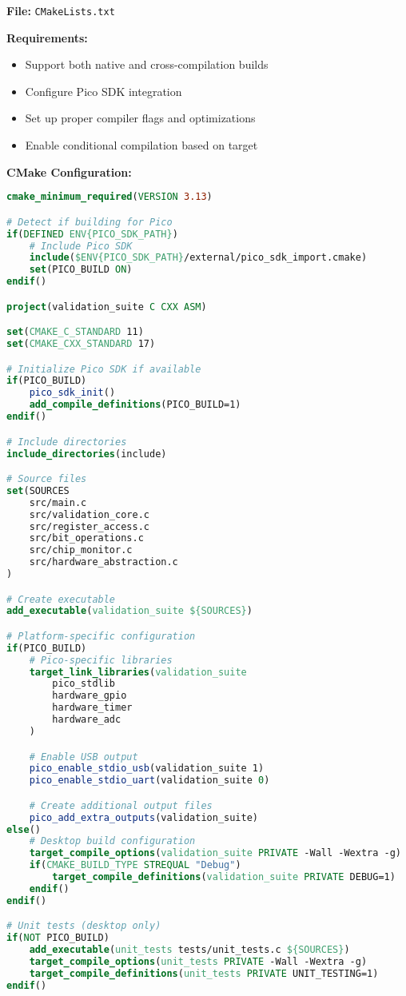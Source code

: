 \documentclass[11pt,a4paper]{article}
\begin{document}
\textbf{File:} \texttt{CMakeLists.txt}

\textbf{Requirements:}
\begin{itemize}
    \item Support both native and cross-compilation builds
    \item Configure Pico SDK integration
    \item Set up proper compiler flags and optimizations
    \item Enable conditional compilation based on target
\end{itemize}

\textbf{CMake Configuration:}
\begin{lstlisting}[language=cmake]
cmake_minimum_required(VERSION 3.13)

# Detect if building for Pico
if(DEFINED ENV{PICO_SDK_PATH})
    # Include Pico SDK
    include($ENV{PICO_SDK_PATH}/external/pico_sdk_import.cmake)
    set(PICO_BUILD ON)
endif()

project(validation_suite C CXX ASM)

set(CMAKE_C_STANDARD 11)
set(CMAKE_CXX_STANDARD 17)

# Initialize Pico SDK if available
if(PICO_BUILD)
    pico_sdk_init()
    add_compile_definitions(PICO_BUILD=1)
endif()

# Include directories
include_directories(include)

# Source files
set(SOURCES
    src/main.c
    src/validation_core.c
    src/register_access.c
    src/bit_operations.c
    src/chip_monitor.c
    src/hardware_abstraction.c
)

# Create executable
add_executable(validation_suite ${SOURCES})

# Platform-specific configuration
if(PICO_BUILD)
    # Pico-specific libraries
    target_link_libraries(validation_suite
        pico_stdlib
        hardware_gpio
        hardware_timer
        hardware_adc
    )

    # Enable USB output
    pico_enable_stdio_usb(validation_suite 1)
    pico_enable_stdio_uart(validation_suite 0)

    # Create additional output files
    pico_add_extra_outputs(validation_suite)
else()
    # Desktop build configuration
    target_compile_options(validation_suite PRIVATE -Wall -Wextra -g)
    if(CMAKE_BUILD_TYPE STREQUAL "Debug")
        target_compile_definitions(validation_suite PRIVATE DEBUG=1)
    endif()
endif()

# Unit tests (desktop only)
if(NOT PICO_BUILD)
    add_executable(unit_tests tests/unit_tests.c ${SOURCES})
    target_compile_options(unit_tests PRIVATE -Wall -Wextra -g)
    target_compile_definitions(unit_tests PRIVATE UNIT_TESTING=1)
endif()
\end{lstlisting}
\end{document}
